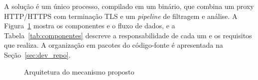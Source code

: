 A solução é um único processo, compilado em um binário, que combina um proxy HTTP/HTTPS com terminação TLS e um \textit{pipeline} de filtragem e análise. A Figura~\ref{fig:arq} mostra os componentes e o fluxo de dados, e a Tabela~\ref{tab:componentes} descreve a responsabilidade de cada um e os requisitos que realiza. A organização em pacotes do código-fonte é apresentada na Seção~\ref{sec:dev_repo}.

\begin{figure}[htb]
\centering
\caption{Arquitetura do mecanismo proposto}\label{fig:arq}
\end{figure}

